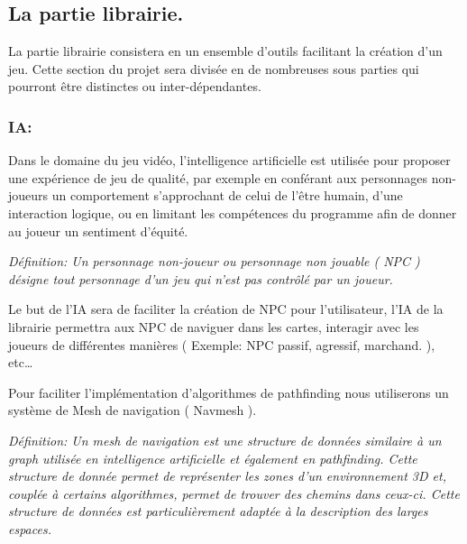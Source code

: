 \documentclass[french, 12pt]{article}
\begin{document}
    \color{black}\subsection{La partie librairie.}\begin{flushleft}
        La partie librairie consistera en un ensemble d’outils facilitant la création d’un jeu. Cette section du projet sera divisée en de nombreuses sous parties qui pourront être distinctes ou inter-dépendantes.
    
        \hspace*{6mm} \subsubsection{IA:}
        \vspace*{1mm}

        Dans le domaine du jeu vidéo, l'intelligence artificielle est utilisée pour proposer une expérience de jeu de qualité, par exemple en conférant aux personnages non-joueurs un comportement s'approchant de celui de l'être humain, d'une interaction logique, ou en limitant les compétences du programme afin de donner au joueur un sentiment d'équité.\newline
        \vspace*{1mm}

        \color{green}
        \emph{Définition: Un personnage non-joueur ou personnage non jouable ( NPC ) désigne tout personnage d'un jeu qui n'est pas contrôlé par un joueur.}\newline
        \vspace*{1mm}

        \color{black}
        Le but de l’IA sera de faciliter la création de NPC pour l’utilisateur, l’IA de la librairie permettra aux NPC de naviguer dans les cartes, interagir avec les joueurs de différentes manières ( Exemple: NPC passif, agressif, marchand. ), etc…\newline
        \vspace*{1mm}
        
        Pour faciliter l’implémentation d'algorithmes de pathfinding nous utiliserons un système de Mesh de navigation ( Navmesh ).\newline
        \vspace*{1mm}

        \color{green}
        \emph{Définition: Un mesh de navigation est une structure de données similaire à un graph utilisée en intelligence artificielle et également en pathfinding. Cette structure de donnée permet de représenter les zones d'un environnement 3D et, couplée à certains algorithmes, permet de trouver des chemins dans ceux-ci. Cette structure de données est particulièrement adaptée à la description des larges espaces.}\newline
        \vspace*{1mm}


\end{flushleft}
\end{document}

